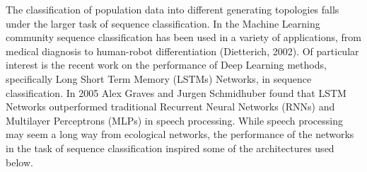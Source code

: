 \documentclass[letterpaper, 10 pt, conference]{ieeeconf}  %
\begin{document}
	The classification of population data into different generating topologies falls under the larger task of sequence classification. In the Machine Learning community sequence classification has been used in a variety of applications, from medical diagnosis to human-robot differentiation (Dietterich, 2002). Of particular interest is the recent work on the performance of Deep Learning methods, specifically Long Short Term Memory (LSTMs) Networks, in sequence classification. In 2005 Alex Graves and Jurgen Schmidhuber found that LSTM Networks outperformed traditional Recurrent Neural Networks (RNNs) and Multilayer Perceptrons (MLPs) in speech processing. While speech processing may seem a long way from ecological networks, the performance of the networks in the task of sequence classification inspired some of the architectures used below. 

\end{document}
